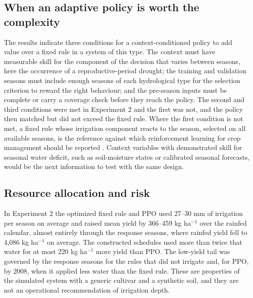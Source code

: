 \documentclass[times,final,authoryear]{elsarticle}
\begin{document}
\subsection{When an adaptive policy is worth the complexity}
\label{subdisc_value}

The results indicate three conditions for a context-conditioned policy to add value over a fixed rule in a system of this type. The context must have measurable skill for the component of the decision that varies between seasons, here the occurrence of a reproductive-period drought; the training and validation seasons must include enough seasons of each hydrological type for the selection criterion to reward the right behaviour; and the pre-season inputs must be complete or carry a coverage check before they reach the policy. The second and third conditions were met in Experiment 2 and the first was not, and the policy then matched but did not exceed the fixed rule. Where the first condition is not met, a fixed rule whose irrigation component reacts to the season, selected on all available seasons, is the reference against which reinforcement learning for crop management should be reported \citep{balderas2025comparative, noa2026hybrid}. Context variables with demonstrated skill for seasonal water deficit, such as soil-moisture states or calibrated seasonal forecasts, would be the next information to test with the same design.

\subsection{Resource allocation and risk}
\label{subdisc_resources}

In Experiment 2 the optimized fixed rule and PPO used 27--30 mm of irrigation per season on average and raised mean yield by 366--459 kg ha$^{-1}$ over the rainfed calendar, almost entirely through the response seasons, where rainfed yield fell to 4,086 kg ha$^{-1}$ on average. The constructed schedules used more than twice that water for at most 220 kg ha$^{-1}$ more yield than PPO. The low-yield tail was governed by the response seasons for the rules that did not irrigate and, for PPO, by 2008, when it applied less water than the fixed rule. These are properties of the simulated system with a generic cultivar and a synthetic soil, and they are not an operational recommendation of irrigation depth.
\end{document}
